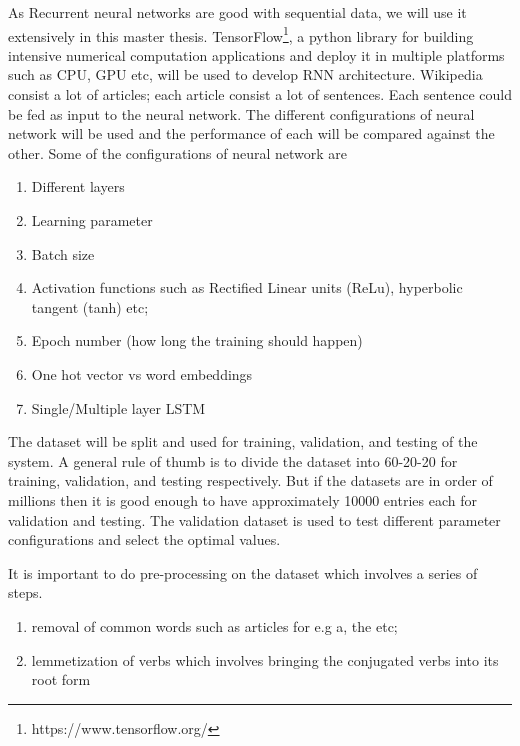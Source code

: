 \documentclass[a4paper, 11pt]{article}
\begin{document}
As Recurrent neural networks are good with sequential data, we will use it extensively in this master thesis. TensorFlow\footnote{https://www.tensorflow.org/}, a python library for building intensive numerical computation applications and deploy it in multiple platforms such as CPU, GPU etc, will be used to develop RNN architecture. Wikipedia consist a lot of articles; each article consist a lot of sentences. Each sentence could be fed as input to the neural network. The different configurations of neural network will be used and the performance of each will be compared against the other. Some of the configurations of neural network are

\begin{enumerate}
\item Different layers
\item Learning parameter 
\item Batch size 
\item Activation functions such as Rectified Linear units (ReLu), hyperbolic tangent (tanh) etc; 
\item Epoch number (how long the training should happen)
\item One hot vector vs word embeddings
\item Single/Multiple layer LSTM
\end{enumerate}

The dataset will be split and used for training, validation, and testing of the system. A general rule of thumb is to divide the dataset into 60-20-20 for training, validation, and testing respectively. But if the datasets are in order of millions then it is good enough to have approximately 10000 entries each for validation and testing. The validation dataset is used to test different parameter configurations and select the optimal values.

It is important to do pre-processing on the dataset which involves a series of steps.
\begin{enumerate}
\item removal of common words such as articles for e.g a, the etc; 
\item lemmetization of verbs which involves bringing the conjugated verbs into its root form 
\end{enumerate}
\end{document}
